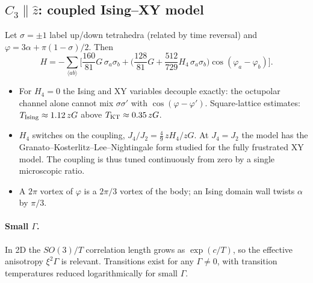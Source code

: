 \documentclass[11pt]{article}
\begin{document}
\subsection*{$C_3\parallel\hat z$: coupled Ising--XY model}
Let $\sigma=\pm1$ label up/down tetrahedra (related by time reversal) and
$\varphi=3\alpha+\pi(1-\sigma)/2$. Then
\begin{equation}
H=-\sum_{\langle ab\rangle}\Big[\frac{160}{81}G\,\sigma_a\sigma_b
+\Big(\frac{128}{81}G+\frac{512}{729}H_4\,\sigma_a\sigma_b\Big)\cos(\varphi_a-\varphi_b)\Big].
\end{equation}
\begin{itemize}
\item For $H_4=0$ the Ising and XY variables decouple exactly: the octupolar channel alone
cannot mix $\sigma\sigma'$ with $\cos(\varphi-\varphi')$. Square-lattice estimates:
$T_{\rm Ising}\approx1.12\,zG$ above $T_{\rm KT}\approx0.35\,zG$.
\item $H_4$ switches on the coupling, $J_4/J_2=\frac49\,zH_4/zG$. At $J_4=J_2$ the model has the
Granato--Kosterlitz--Lee--Nightingale form studied for the fully frustrated XY model.
The coupling is thus tuned continuously from zero by a single microscopic ratio.
\item A $2\pi$ vortex of $\varphi$ is a $2\pi/3$ vortex of the body; an Ising domain wall twists
$\alpha$ by $\pi/3$.
\end{itemize}

\paragraph{Small $\Gamma$.} In 2D the $SO(3)/T$ correlation length grows as $\exp(c/T)$, so the
effective anisotropy $\xi^2\Gamma$ is relevant. Transitions exist for any $\Gamma\neq0$, with
transition temperatures reduced logarithmically for small $\Gamma$.
\end{document}
